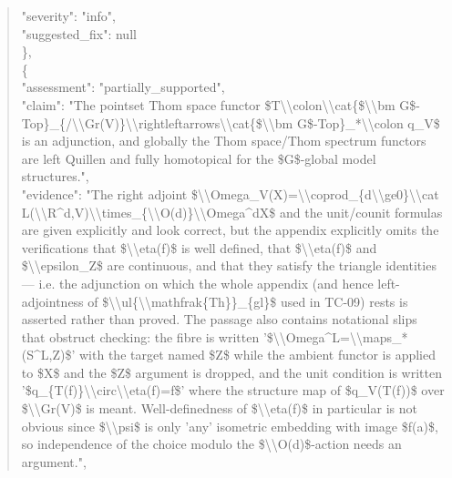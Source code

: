 \documentclass[11pt]{article}
\begin{document}
\begin{quote}
      "severity": "info",\\
      "suggested\_fix": null\\
    \},\\
    \{\\
      "assessment": "partially\_supported",\\
      "claim": "The pointset Thom space functor \$T\textbackslash{}\textbackslash{}colon\textbackslash{}\textbackslash{}cat\{\$\textbackslash{}\textbackslash{}bm G\$-Top\}\_\{/\textbackslash{}\textbackslash{}Gr(V)\}\textbackslash{}\textbackslash{}rightleftarrows\textbackslash{}\textbackslash{}cat\{\$\textbackslash{}\textbackslash{}bm G\$-Top\}\_*\textbackslash{}\textbackslash{}colon q\_V\$ is an adjunction, and globally the Thom space/Thom spectrum functors are left Quillen and fully homotopical for the \$G\$-global model structures.",\\
      "evidence": "The right adjoint \$\textbackslash{}\textbackslash{}Omega\_V(X)=\textbackslash{}\textbackslash{}coprod\_\{d\textbackslash{}\textbackslash{}ge0\}\textbackslash{}\textbackslash{}cat L(\textbackslash{}\textbackslash{}R\^{}d,V)\textbackslash{}\textbackslash{}times\_\{\textbackslash{}\textbackslash{}O(d)\}\textbackslash{}\textbackslash{}Omega\^{}dX\$ and the unit/counit formulas are given explicitly and look correct, but the appendix explicitly omits the verifications that \$\textbackslash{}\textbackslash{}eta(f)\$ is well defined, that \$\textbackslash{}\textbackslash{}eta(f)\$ and \$\textbackslash{}\textbackslash{}epsilon\_Z\$ are continuous, and that they satisfy the triangle identities --- i.e. the adjunction on which the whole appendix (and hence left-adjointness of \$\textbackslash{}\textbackslash{}ul\{\textbackslash{}\textbackslash{}mathfrak\{Th\}\}\_\{gl\}\$ used in TC-09) rests is asserted rather than proved. The passage also contains notational slips that obstruct checking: the fibre is written '\$\textbackslash{}\textbackslash{}Omega\^{}L=\textbackslash{}\textbackslash{}maps\_*(S\^{}L,Z)\$' with the target named \$Z\$ while the ambient functor is applied to \$X\$ and the \$Z\$ argument is dropped, and the unit condition is written '\$q\_\{T(f)\}\textbackslash{}\textbackslash{}circ\textbackslash{}\textbackslash{}eta(f)=f\$' where the structure map of \$q\_V(T(f))\$ over \$\textbackslash{}\textbackslash{}Gr(V)\$ is meant. Well-definedness of \$\textbackslash{}\textbackslash{}eta(f)\$ in particular is not obvious since \$\textbackslash{}\textbackslash{}psi\$ is only 'any' isometric embedding with image \$f(a)\$, so independence of the choice modulo the \$\textbackslash{}\textbackslash{}O(d)\$-action needs an argument.",\\

\end{quote}
\end{document}
